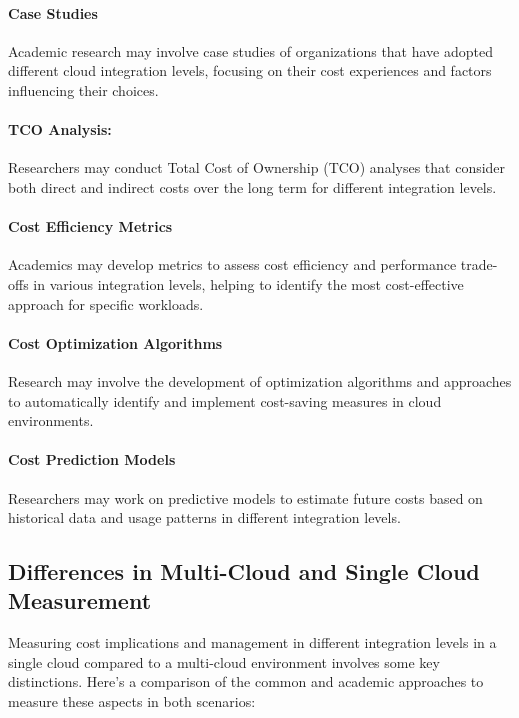 \paragraph{Case Studies}

Academic research may involve case studies of organizations that have adopted different cloud integration levels, 
focusing on their cost experiences and factors influencing their choices.

\paragraph{TCO Analysis:}
Researchers may conduct Total Cost of Ownership (TCO) analyses that consider both direct and 
indirect costs over the long term for different integration levels.

\paragraph{Cost Efficiency Metrics}
Academics may develop metrics to assess cost efficiency and performance trade-offs in various integration levels, 
helping to identify the most cost-effective approach for specific workloads.

\paragraph{Cost Optimization Algorithms}
Research may involve the development of optimization algorithms and approaches to automatically identify 
and implement cost-saving measures in cloud environments.

\paragraph{Cost Prediction Models}
Researchers may work on predictive models to estimate future costs based on historical data and usage patterns in different integration levels.


\subsection{Differences in Multi-Cloud and Single Cloud \\Measurement}

Measuring cost implications and management in different integration levels in a single cloud compared to a multi-cloud environment involves some key distinctions. 
Here's a comparison of the common and academic approaches to measure these aspects in both scenarios:

